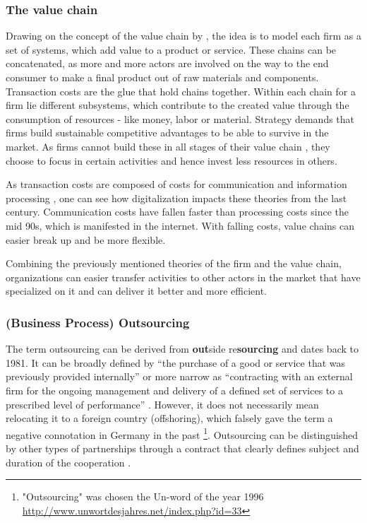 		\subsubsection{The value chain}
		Drawing on the concept of the value chain by \cite{porter1985}, the idea is to model each firm as a set of systems, which add value to a product or service. These chains can be concatenated, as more and more actors are involved on the way to the end consumer to make a final product out of raw materials and components. Transaction costs are the glue that hold chains together. Within each chain for a firm lie different subsystems, which contribute to the created value through the consumption of resources - like money, labor or material. Strategy demands that firms build sustainable competitive advantages to be able to survive in the market. As firms cannot build these in all stages of their value chain \citep{Ramachandran2004}, they choose to focus in certain activities and hence invest less resources in others. 
		
		As transaction costs are composed of costs for communication and information processing \citep{evansted}, one can see how digitalization impacts these theories from the last century. Communication costs have fallen faster than processing costs since the mid 90s, which is manifested in the internet. With falling costs, value chains can easier break up and be more flexible.
		
		Combining the previously mentioned theories of the firm and the value chain, organizations can easier transfer activities to other actors in the market that have specialized on it and can deliver it better and more efficient.  
		
			\subsubsection{(Business Process) Outsourcing}
		The term outsourcing can be derived from \textbf{out}side re\textbf{sourcing} and dates back to 1981\citep{oxford}. It can be broadly defined by \enquote{the purchase of a good or service that was previously provided internally} \citep[]{lacity1993} or more narrow as \enquote{contracting with an external firm for the ongoing management and delivery of a defined set of services to a prescribed level of performance} \citep[]{cohen2006multisourcing} . However, it does not necessarily mean relocating it to a foreign country (offshoring), which falsely gave the term a negative connotation in Germany in the past \footnote{ "Outsourcing" was chosen the Un-word of the year 1996 \url{http://www.unwortdesjahres.net/index.php?id=33}}. Outsourcing can be distinguished by other types of partnerships through a contract that clearly defines subject and duration of the cooperation . 
		
